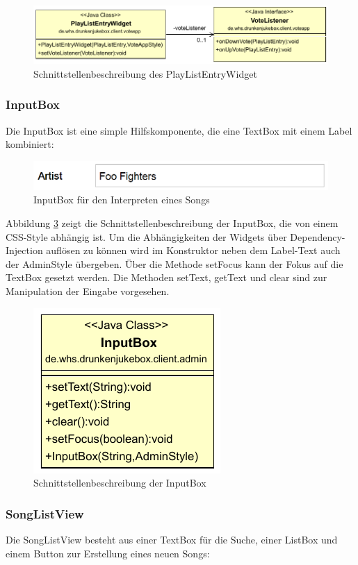 \begin{figure}[tbh]
	\centering
	\includegraphics[width=1.0\linewidth]{Bilder/PlayListEntry.pdf}
	\caption{Schnittstellenbeschreibung des PlayListEntryWidget}
	\label{fig:PlayListEntryClass}
\end{figure}


\subsubsection{InputBox}
Die InputBox ist eine simple Hilfskomponente, die eine TextBox mit einem Label kombiniert:

\begin{figure}[H]
\centering
\includegraphics[width=0.7\linewidth]{Bilder/InputBox}
\caption{InputBox für den Interpreten eines Songs}
\label{fig:InputBox}
\end{figure}

Abbildung \ref{fig:InputBoxClass} zeigt die Schnittstellenbeschreibung der InputBox, die von einem CSS-Style abhängig ist. Um die Abhängigkeiten der Widgets über Dependency-Injection auflösen zu können wird im Konstruktor neben dem Label-Text auch der AdminStyle übergeben. Über die Methode setFocus kann der Fokus auf die TextBox gesetzt werden. Die Methoden setText, getText und clear sind zur Manipulation der Eingabe vorgesehen.

\begin{figure}[H]
\centering
\includegraphics[width=0.3\linewidth]{Bilder/InputBoxClass}
\caption{Schnittstellenbeschreibung der InputBox}
\label{fig:InputBoxClass}
\end{figure}


\newpage
\subsubsection{SongListView}
Die SongListView besteht aus einer TextBox für die Suche, einer ListBox und einem Button zur Erstellung eines neuen Songs:

